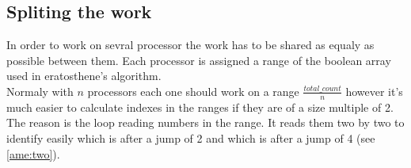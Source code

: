 \subsection{Spliting the work}


In order to work on sevral processor the work has to be shared as equaly as possible between them. Each processor is assigned a range of the boolean array used in eratosthene's algorithm.\\Normaly with $n$ processors each one should work on a range $\frac{total\_count}{n}$ however it's much easier to calculate indexes in the ranges if they are of a size multiple of 2. The reason is the loop reading numbers in the range. It reads them two by two to identify easily which is after a jump of 2 and which is after a jump of 4 (see \ref{ame:two}).  



